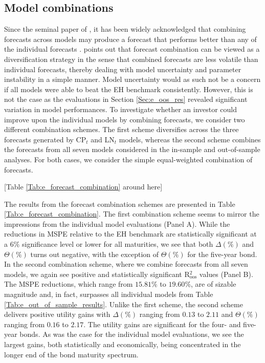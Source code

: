 \documentclass[12pt,letterpaper,leqno,doublespacing]{article}
\begin{document}
\subsection{Model combinations}\label{Sec:e_model_combinations}
Since the seminal paper of \cite{BatesGranger1969}, it has been widely acknowledged that combining forecasts across models may produce a forecast that performs better than any of the individual forecasts \citep{RapachStraussZhou,DanglHalling2012}. \cite{Timmermann2006} points out that forecast combination can be viewed as a diversification strategy in the sense that combined forecasts are less volatile than individual forecasts, thereby dealing with model uncertainty and parameter instability in a simple manner. Model uncertainty would as such not be a concern if all models were able to beat the EH benchmark consistently. However, this is not the case as the evaluations in Section \ref{Sec:e_oos_res} revealed significant variation in model performances. To investigate whether an investor could improve upon the individual models by combining forecasts, we consider two different combination schemes. The first scheme diversifies across the three forecasts generated by CP$_{t}$ and LN$_{t}$ models, whereas the second scheme combines the forecasts from all seven models considered in the in-sample and out-of-sample analyses. For both cases, we consider the simple equal-weighted combination of forecasts. 

\begin{center}
    [Table \ref{Tab:e_forecast_combination} around here]
\end{center}

The results from the forecast combination schemes are presented in Table \ref{Tab:e_forecast_combination}. The first combination scheme seems to mirror the impressions from the individual model evaluations (Panel A). While the reductions in MSPE relative to the EH benchmark are statistically significant at a $6\%$ significance level or lower for all maturities, we see that both $\Delta\left(\%\right)$ and $\Theta\left(\%\right)$ turns out negative, with the exception of $\Theta\left(\%\right)$ for the five-year bond. In the second combination scheme, where we combine forecasts from all seven models, we again see positive and statistically significant R$^{2}_{\text{oos}}$ values (Panel B). The MSPE reductions, which range from $15.81\%$ to $19.60\%$, are of sizable magnitude and, in fact, surpasses all individual models from Table \ref{Tab:e_out_of_sample_results}. Unlike the first scheme, the second scheme delivers positive utility gains with $\Delta\left(\%\right)$ ranging from $0.13$ to $2.11$ and $\Theta\left(\%\right)$ ranging from $0.16$ to $2.17$. The utility gains are significant for the four- and five-year bonds. As was the case for the individual model evaluations, we see the largest gains, both statistically and economically, being concentrated in the longer end of the bond maturity spectrum.
\end{document}
